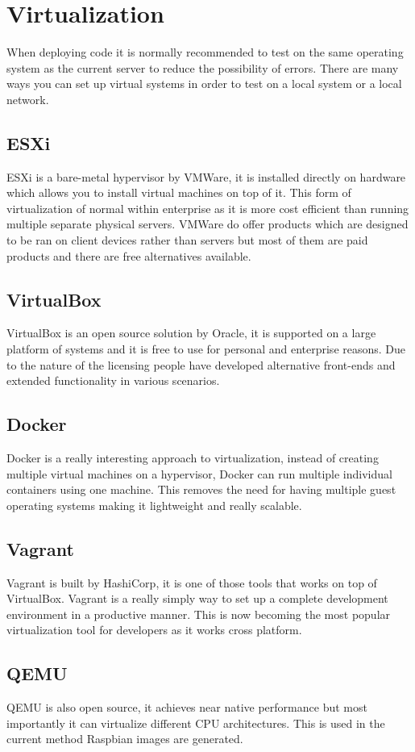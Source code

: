 \documentclass[12pt,a4paper]{report}
\begin{document}
\section{Virtualization}
When deploying code it is normally recommended to test on the same operating system as the current server to reduce the possibility of errors. There are many ways you can set up virtual systems in order to test on a local system or a local network.  
\subsection{ESXi}
ESXi \citep{esxi} is a bare-metal hypervisor by VMWare, it is installed directly on hardware which allows you to install virtual machines on top of it. This form of virtualization of normal within enterprise as it is more cost efficient than running multiple separate physical servers. VMWare do offer products which are designed to be ran on client devices rather than servers but most of them are paid products and there are free alternatives available.
\subsection{VirtualBox}
VirtualBox \citep{virtualbox} is an open source solution by Oracle, it is supported on a large platform of systems and it is free to use for personal and enterprise reasons. Due to the nature of the licensing people have developed alternative front-ends and extended functionality in various scenarios. 

\subsection{Docker}
Docker \citep{docker} is a really interesting approach to virtualization, instead of creating multiple virtual machines on a hypervisor, Docker can run multiple individual containers using one machine. This removes the need for having multiple guest operating systems making it lightweight and really scalable.  
\subsection{Vagrant}
Vagrant \citep{vagrant} is built by HashiCorp, it is one of those tools that works on top of VirtualBox. Vagrant is a really simply way to set up a complete development environment in a productive manner. This is now becoming the most popular virtualization tool for developers as it works cross platform. 
\subsection{QEMU}
QEMU \citep{qemu} is also open source, it achieves near native performance but most \\importantly it can virtualize different CPU architectures. This is used in the current method Raspbian images are generated. 
\end{document}
